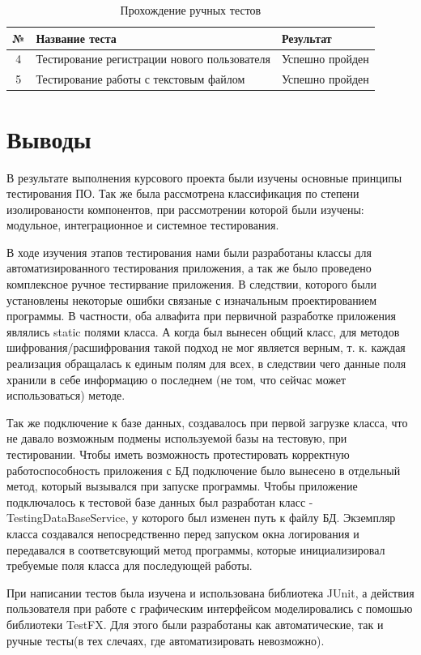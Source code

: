 \documentclass[a4paper,12pt]{article}
\begin{document}
\begin{table}[h!]
	\caption{Прохождение ручных тестов}
	\centering
	\begin{tabular}{|c|l|l|}
	\hline 
	№ &  Название теста & Результат \\ 
	\hline
	4 & Тестирование регистрации нового пользователя & Успешно пройден  \\
	\hline
	5 &  Тестирование работы с текстовым файлом & Успешно пройден  \\
	\hline
\end{tabular} 
\label{table:system_testing_by_hands} 
\end{table}

\newpage\section*{Выводы}
В результате выполнения курсового проекта были изучены основные принципы тестирования ПО. Так же была рассмотрена классификация по степени изолированости компонентов, при рассмотрении которой были изучены: модульное, интеграционное и системное тестирования. 
\par В ходе изучения этапов тестирования нами были разработаны классы для автоматизированного тестирования приложения, а так же было проведено комплексное ручное тестирвание приложения. В следствии, которого были установлены некоторые ошибки связаные с изначальным проектированием программы. В частности, оба алвафита при первичной разработке приложения являлись static полями класса. А когда был вынесен общий класс, для методов шифрования/расшифрования такой подход не мог является верным, т. к. каждая реализация обращалась к единым полям для всех, в следствии чего данные поля хранили в себе информацию о последнем (не том, что сейчас может использоваться) методе.
\par Так же подключение к базе данных, создавалось при первой загрузке класса, что не давало возможным подмены используемой базы на тестовую, при тестировании. Чтобы иметь возможность протестировать корректную работоспособность приложения с БД подключение было вынесено в отдельный метод, который вызывался при запуске программы. Чтобы приложение подключалось к тестовой базе данных был разработан класс - TestingDataBaseService, у которого был изменен путь к файлу БД. Экземпляр класса создавался непосредственно перед запуском окна логирования и передавался в соответсвующий метод программы, которые инициализировал требуемые поля класса для последующей работы.
\par При написании тестов была изучена и использована библиотека JUnit, а действия пользователя при работе с графическим интерфейсом моделировались с помошью библиотеки TestFX. Для этого были разработаны как автоматические, так и ручные тесты(в тех слечаях, где автоматизировать невозможно).
\end{document}
